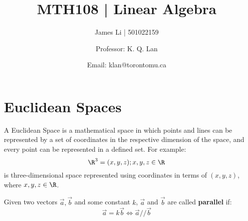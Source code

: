 \documentclass[a4paper]{article}
\title{MTH108 | Linear Algebra}
\author{James Li | 501022159 \and Professor: K. Q. Lan\and Email: klan@torontomu.ca}
\date{}
\begin{document}
  \maketitle
  \tableofcontents
  \newpage
  \section{Euclidean Spaces} 
  A Euclidean Space is a mathematical space in which points and lines can be represented by a set of coordinates in the respective dimension of the space, and every point can be represented in a defined set. For example:
  $$
  \R^3 = {(x,y,z); x,y,z \in \R}
  $$
  is three-dimensional space represented using coordinates in terms of $(x,y,z)$, where $x,y,z \in \R$.
  \begin{theorem}
    Given two vectors $\vec{a},\vec{b}$ and some constant $k$, $\vec{a}$ and $\vec{b}$ are called \textbf{parallel} if:
    \begin{displaymath}
      \vec{a} = k\vec{b} \Leftrightarrow \vec{a} // \vec{b}
    \end{displaymath}
    
  \end{theorem}
  
\end{document}
